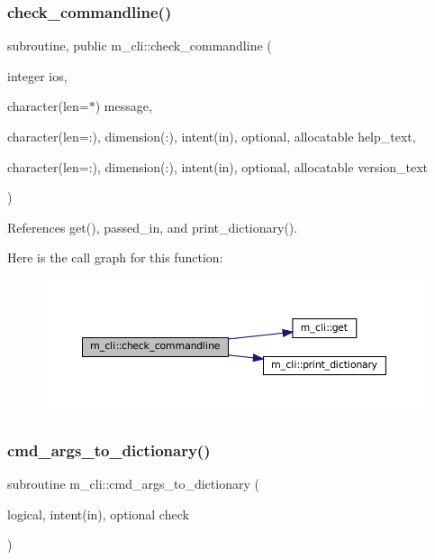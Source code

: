 \subsubsection{\texorpdfstring{check\+\_\+commandline()}{check\_commandline()}}
{\footnotesize\ttfamily subroutine, public m\+\_\+cli\+::check\+\_\+commandline (\begin{DoxyParamCaption}\item[{integer}]{ios,  }\item[{character(len=$\ast$)}]{message,  }\item[{character(len=\+:), dimension(\+:), intent(in), optional, allocatable}]{help\+\_\+text,  }\item[{character(len=\+:), dimension(\+:), intent(in), optional, allocatable}]{version\+\_\+text }\end{DoxyParamCaption})}



References get(), passed\+\_\+in, and print\+\_\+dictionary().

Here is the call graph for this function\+:
\nopagebreak
\begin{figure}[H]
\begin{center}
\leavevmode
\includegraphics[width=350pt]{namespacem__cli_a62056f0c153eb63cb0b11a21edb028cd_cgraph}
\end{center}
\end{figure}
\mbox{\label{namespacem__cli_a89a63254465b02048f09541e51974764}} 
\subsubsection{\texorpdfstring{cmd\+\_\+args\+\_\+to\+\_\+dictionary()}{cmd\_args\_to\_dictionary()}}
{\footnotesize\ttfamily subroutine m\+\_\+cli\+::cmd\+\_\+args\+\_\+to\+\_\+dictionary (\begin{DoxyParamCaption}\item[{logical, intent(in), optional}]{check }\end{DoxyParamCaption})\hspace{0.3cm}{\ttfamily [private]}}



